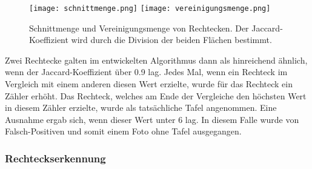 \begin{figure}[h!]
\texttt{[image: schnittmenge.png]}
\texttt{[image: vereinigungsmenge.png]}
\caption{Schnittmenge und Vereinigungsmenge von Rechtecken. Der Jaccard-Koeffizient wird durch die Division der beiden Flächen bestimmt.}
\label{fig:jaccard}
\end{figure}

Zwei Rechtecke galten im entwickelten Algorithmus dann als hinreichend ähnlich, wenn der Jaccard-Koeffizient über 0.9 lag. Jedes Mal, wenn ein Rechteck im Vergleich mit einem anderen diesen Wert erzielte, wurde für das Rechteck ein Zähler erhöht. Das Rechteck, welches am Ende der Vergleiche den höchsten Wert in diesem Zähler erzielte, wurde als tatsächliche Tafel angenommen. Eine Ausnahme ergab sich, wenn dieser Wert unter 6 lag. In diesem Falle wurde von Falsch-Positiven und somit einem Foto ohne Tafel ausgegangen. %

\subsubsection*{Rechteckserkennung}

